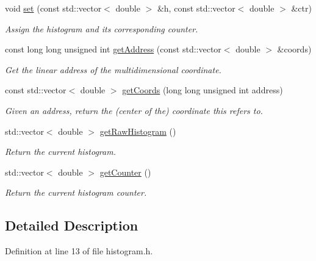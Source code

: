 \begin{DoxyCompactItemize}
void \hyperlink{classhistogram_aab27615593d020ca4de29c586c92af37}{set} (const std\-::vector$<$ double $>$ \&h, const std\-::vector$<$ double $>$ \&ctr)
\begin{DoxyCompactList}\small\item\em Assign the histogram and its corresponding counter. \end{DoxyCompactList}\item 
const long long unsigned int \hyperlink{classhistogram_ae52fa58934b56e05846a66e43c3184bd}{get\-Address} (const std\-::vector$<$ double $>$ \&coords)
\begin{DoxyCompactList}\small\item\em Get the linear address of the multidimensional coordinate. \end{DoxyCompactList}\item 
const std\-::vector$<$ double $>$ \hyperlink{classhistogram_a51aaf60b509809204f21934a18005b38}{get\-Coords} (long long unsigned int address)
\begin{DoxyCompactList}\small\item\em Given an address, return the (center of the) coordinate this refers to. \end{DoxyCompactList}\item 
std\-::vector$<$ double $>$ \hyperlink{classhistogram_afa81289dc32207eb3c44f8bd746f0d1d}{get\-Raw\-Histogram} ()
\begin{DoxyCompactList}\small\item\em Return the current histogram. \end{DoxyCompactList}\item 
std\-::vector$<$ double $>$ \hyperlink{classhistogram_a7d3541bd86551053f9fda7b5ae81e3e8}{get\-Counter} ()
\begin{DoxyCompactList}\small\item\em Return the current histogram counter. \end{DoxyCompactList}\end{DoxyCompactItemize}


\subsection{Detailed Description}


Definition at line 13 of file histogram.\-h.



